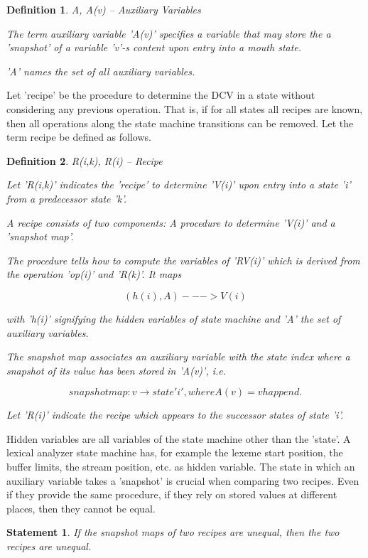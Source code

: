 \documentclass[12pt]{article}
\newtheorem{definition}{Definition}
\newtheorem{statement}{Statement}
\begin{document}
\begin{definition}
A, A(v) -- Auxiliary Variables

The term auxiliary variable 'A(v)' specifies a variable that may store the
a 'snapshot' of a variable 'v'-s content upon entry into a mouth state. 
   
'A' names the set of all auxiliary variables.
\end{definition}

Let 'recipe' be the procedure to determine the DCV in a state without
considering any previous operation. That is, if for all states all recipes are
known, then all operations along the state machine transitions can be removed.
Let the term recipe be defined as follows.

\begin{definition}
R(i,k), R(i) -- Recipe 

Let 'R(i,k)' indicates the 'recipe' to determine 'V(i)' upon entry into a
state 'i' from a predecessor state 'k'.  

A recipe consists of two components: A procedure to determine 'V(i)' and a
'snapshot map'. 

The procedure tells how to compute the variables of 'RV(i)' which is derived
from the operation 'op(i)' and 'R(k)'.  It maps

\[
    (h(i), A) ---> V(i)                                             
\]

with 'h(i)' signifying the hidden variables of state machine and 'A' the
set of auxiliary variables. 

The snapshot map associates an auxiliary variable with the state index
where a snapshot of its value has been stored in 'A(v)', i.e.

\[
    snapshot map:  v \rightarrow state 'i', where A(v) = v happend.
\]

Let 'R(i)' indicate the recipe which appears to the successor states of
state 'i'.
\end{definition}

Hidden variables are all variables of the state machine other than the 'state'.
A lexical analyzer state machine has, for example the lexeme start position,
the buffer limits, the stream position, etc. as hidden variable. The state
in which an auxiliary variable takes a 'snapshot' is crucial when comparing
two recipes. Even if they provide the same procedure, if they rely on stored
values at different places, then they cannot be equal.

\begin{statement}
   If the snapshot maps of two recipes are unequal, then the two recipes
   are unequal.
\end{statement}
\end{document}
